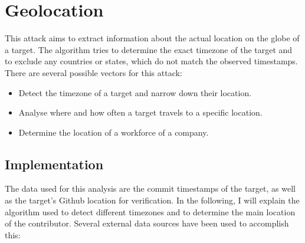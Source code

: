 \section{Geolocation}

This attack aims to extract information about the actual location on the globe of a target.
The algorithm tries to determine the exact timezone of the target and to exclude any countries or states, which do not match the observed timestamps.
There are several possible vectors for this attack:

\begin{itemize}
    \item Detect the timezone of a target and narrow down their location.
    \item Analyse where and how often a target travels to a specific location.
    \item Determine the location of a workforce of a company.
\end{itemize}


\subsection{Implementation}\label{travel-implementation}

The data used for this analysis are the commit timestamps of the target, as well as the target's Github location for verification.
In the following, I will explain the algorithm used to detect different timezones and to determine the main location of the contributor.
Several external data sources have been used to accomplish this:

